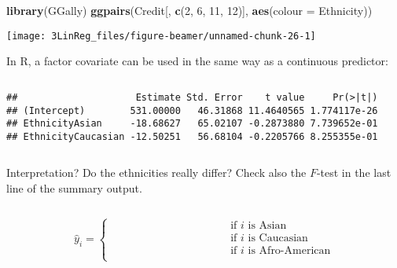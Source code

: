 \documentclass[10pt,ignorenonframetext,]{beamer}
\newenvironment{Shaded}{\begin{snugshade}}{\end{snugshade}}
\newcommand{\DataTypeTok}[1]{\textcolor[rgb]{0.13,0.29,0.53}{#1}}
\newcommand{\DecValTok}[1]{\textcolor[rgb]{0.00,0.00,0.81}{#1}}
\newcommand{\KeywordTok}[1]{\textcolor[rgb]{0.13,0.29,0.53}{\textbf{#1}}}
\newcommand{\NormalTok}[1]{#1}
\newcommand{\OperatorTok}[1]{\textcolor[rgb]{0.81,0.36,0.00}{\textbf{#1}}}
\newcommand{\StringTok}[1]{\textcolor[rgb]{0.31,0.60,0.02}{#1}}
\begin{document}
\begin{frame}[fragile]

\scriptsize

\begin{Shaded}
\begin{Highlighting}[]
\KeywordTok{library}\NormalTok{(GGally)}
\KeywordTok{ggpairs}\NormalTok{(Credit[, }\KeywordTok{c}\NormalTok{(}\DecValTok{2}\NormalTok{, }\DecValTok{6}\NormalTok{, }\DecValTok{11}\NormalTok{, }\DecValTok{12}\NormalTok{)], }\KeywordTok{aes}\NormalTok{(}\DataTypeTok{colour =}\NormalTok{ Ethnicity))}
\end{Highlighting}
\end{Shaded}

\texttt{[image: 3LinReg\_files/figure-beamer/unnamed-chunk-26-1]}

\end{frame}

\begin{frame}[fragile]

In R, a factor covariate can be used in the same way as a continuous
predictor:

\(~\)

\scriptsize

\begin{Shaded}
\end{Shaded}

\begin{verbatim}
##                     Estimate Std. Error    t value     Pr(>|t|)
## (Intercept)        531.00000   46.31868 11.4640565 1.774117e-26
## EthnicityAsian     -18.68627   65.02107 -0.2873880 7.739652e-01
## EthnicityCaucasian -12.50251   56.68104 -0.2205766 8.255355e-01
\end{verbatim}

\(~\)

\normalsize

Interpretation? Do the ethnicities really differ? Check also the
\(F\)-test in the last line of the summary output.

\(~\)

\begin{equation*}
\hat{y}_i = \left\{
\begin{array}{ll}
\qquad \qquad\qquad \qquad\qquad & \text{if $i$ is Asian}\\[2mm]
\qquad \qquad\qquad \qquad\qquad & \text{if $i$ is Caucasian}\\[2mm]
\qquad \qquad\qquad \qquad\qquad & \text{if $i$ is Afro-American}\\
\end{array}\right.
\end{equation*}

\end{frame}
\end{document}
